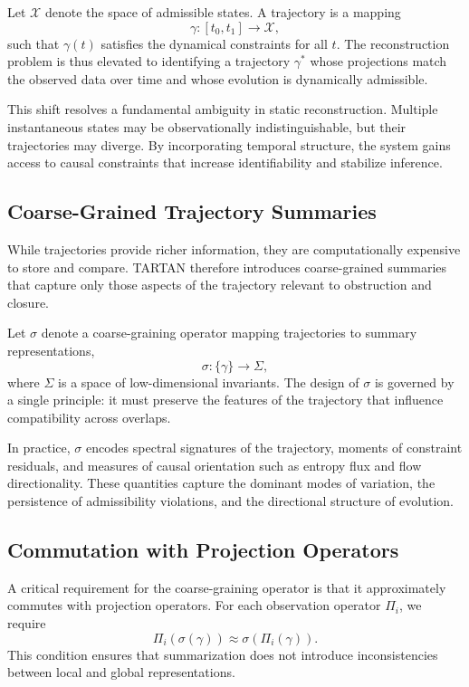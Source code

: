 \documentclass[12pt, oneside]{article}
\begin{document}
Let $\mathcal{X}$ denote the space of admissible states. A trajectory is a mapping
\[
\gamma : [t_0, t_1] \to \mathcal{X},
\]
such that $\gamma(t)$ satisfies the dynamical constraints for all $t$. The reconstruction problem is thus elevated to identifying a trajectory $\gamma^\ast$ whose projections match the observed data over time and whose evolution is dynamically admissible.

This shift resolves a fundamental ambiguity in static reconstruction. Multiple instantaneous states may be observationally indistinguishable, but their trajectories may diverge. By incorporating temporal structure, the system gains access to causal constraints that increase identifiability and stabilize inference.

\subsection{Coarse-Grained Trajectory Summaries}

While trajectories provide richer information, they are computationally expensive to store and compare. TARTAN therefore introduces coarse-grained summaries that capture only those aspects of the trajectory relevant to obstruction and closure.

Let $\sigma$ denote a coarse-graining operator mapping trajectories to summary representations,
\[
\sigma : \{\gamma\} \to \Sigma,
\]
where $\Sigma$ is a space of low-dimensional invariants. The design of $\sigma$ is governed by a single principle: it must preserve the features of the trajectory that influence compatibility across overlaps.

In practice, $\sigma$ encodes spectral signatures of the trajectory, moments of constraint residuals, and measures of causal orientation such as entropy flux and flow directionality. These quantities capture the dominant modes of variation, the persistence of admissibility violations, and the directional structure of evolution.

\subsection{Commutation with Projection Operators}

A critical requirement for the coarse-graining operator is that it approximately commutes with projection operators. For each observation operator $\Pi_i$, we require
\[
\Pi_i(\sigma(\gamma)) \approx \sigma(\Pi_i(\gamma)).
\]
This condition ensures that summarization does not introduce inconsistencies between local and global representations.
\end{document}
